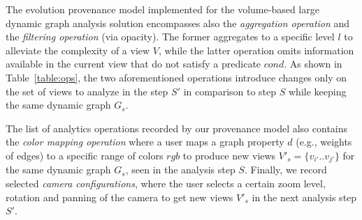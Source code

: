 The evolution provenance model implemented for the volume-based large dynamic graph analysis solution encompasses also the \emph{aggregation operation} and the \emph{filtering operation} (via opacity). 
The former aggregates to a specific level $l$ to alleviate the complexity of a view $V$, while the latter operation omits information available in the current view that do not satisfy a predicate $cond$. As shown in Table~\ref{table:ops}, the two aforementioned operations introduce changes only on the set of views to analyze in the step $S'$ in comparison to step $S$ while keeping the same dynamic graph $G_s$.

The list of analytics operations recorded by our provenance model also contains the \emph{color mapping operation} where a user maps a graph property $d$ (e.g., weights of edges) to a specific range of colors $rgb$ to produce new views $V'_{s}=\{v_{i'}..v_{j'}\}$ for the same dynamic graph $G_s$, seen in the analysis step $S$. 
Finally, we record selected \emph{camera configurations}, where the user selects a certain zoom level, rotation and panning of the camera to get new views $V'_s$ in the next analysis step $S'$.

%
%

